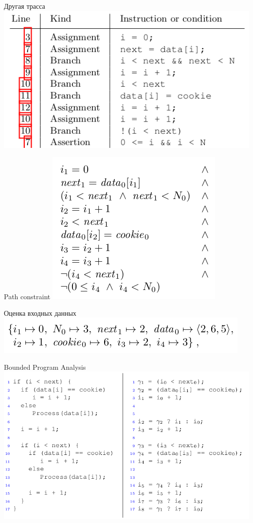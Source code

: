 \documentclass{beamer}
\begin{document}
\begin{frame}{Другая трасса}
\includegraphics[scale=0.5]{trace2.png}
\end{frame}

\begin{frame}{Path constraint}
\includegraphics[scale=0.5]{path_constraint2.png}
\end{frame}

\begin{frame}{Оценка входных данных}
\includegraphics[scale=0.5]{eval.png}
\end{frame}

\begin{frame}{Bounded Program Analysis}
\includegraphics[scale=0.45]{bounded_program_analysis.png}
\end{frame}
\end{document}
